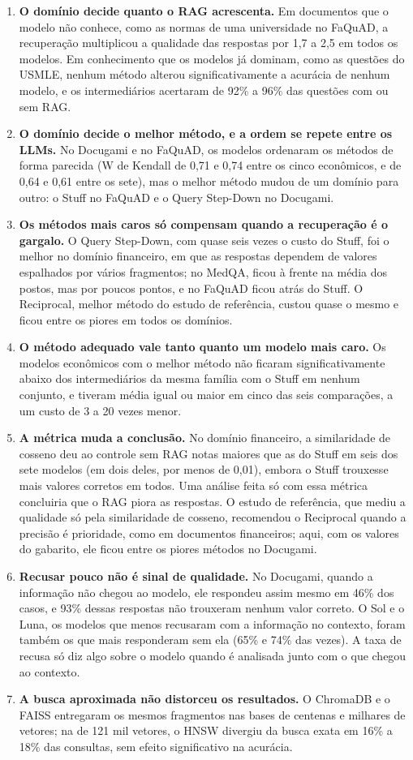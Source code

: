\begin{enumerate}
  \item \textbf{O domínio decide quanto o RAG acrescenta.} Em documentos que o modelo não conhece, como as normas de uma universidade no FaQuAD, a recuperação multiplicou a qualidade das respostas por 1,7 a 2,5 em todos os modelos. Em conhecimento que os modelos já dominam, como as questões do USMLE, nenhum método alterou significativamente a acurácia de nenhum modelo, e os intermediários acertaram de 92\% a 96\% das questões com ou sem RAG.
  \item \textbf{O domínio decide o melhor método, e a ordem se repete entre os LLMs.} No Docugami e no FaQuAD, os modelos ordenaram os métodos de forma parecida (W de Kendall de 0,71 e 0,74 entre os cinco econômicos, e de 0,64 e 0,61 entre os sete), mas o melhor método mudou de um domínio para outro: o Stuff no FaQuAD e o Query Step-Down no Docugami.
  \item \textbf{Os métodos mais caros só compensam quando a recuperação é o gargalo.} O Query Step-Down, com quase seis vezes o custo do Stuff, foi o melhor no domínio financeiro, em que as respostas dependem de valores espalhados por vários fragmentos; no MedQA, ficou à frente na média dos postos, mas por poucos pontos, e no FaQuAD ficou atrás do Stuff. O Reciprocal, melhor método do estudo de referência, custou quase o mesmo e ficou entre os piores em todos os domínios.
  \item \textbf{O método adequado vale tanto quanto um modelo mais caro.} Os modelos econômicos com o melhor método não ficaram significativamente abaixo dos intermediários da mesma família com o Stuff em nenhum conjunto, e tiveram média igual ou maior em cinco das seis comparações, a um custo de 3 a 20 vezes menor.
  \item \textbf{A métrica muda a conclusão.} No domínio financeiro, a similaridade de cosseno deu ao controle sem RAG notas maiores que as do Stuff em seis dos sete modelos (em dois deles, por menos de 0,01), embora o Stuff trouxesse mais valores corretos em todos. Uma análise feita só com essa métrica concluiria que o RAG piora as respostas. O estudo de referência, que mediu a qualidade só pela similaridade de cosseno, recomendou o Reciprocal quando a precisão é prioridade, como em documentos financeiros; aqui, com os valores do gabarito, ele ficou entre os piores métodos no Docugami.
  \item \textbf{Recusar pouco não é sinal de qualidade.} No Docugami, quando a informação não chegou ao modelo, ele respondeu assim mesmo em 46\% dos casos, e 93\% dessas respostas não trouxeram nenhum valor correto. O Sol e o Luna, os modelos que menos recusaram com a informação no contexto, foram também os que mais responderam sem ela (65\% e 74\% das vezes). A taxa de recusa só diz algo sobre o modelo quando é analisada junto com o que chegou ao contexto.
  \item \textbf{A busca aproximada não distorceu os resultados.} O ChromaDB e o FAISS entregaram os mesmos fragmentos nas bases de centenas e milhares de vetores; na de 121 mil vetores, o HNSW divergiu da busca exata em 16\% a 18\% das consultas, sem efeito significativo na acurácia.
\end{enumerate}

